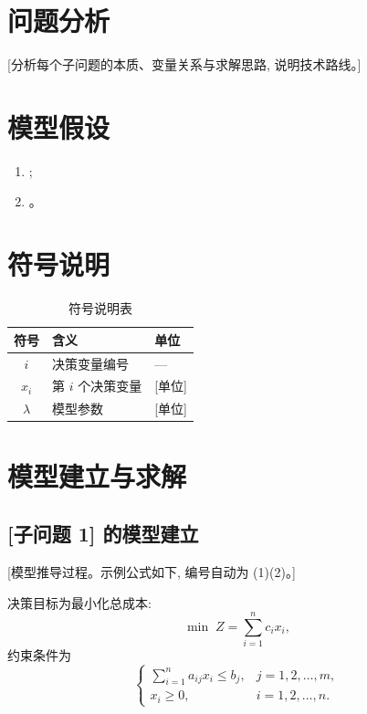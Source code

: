 \documentclass[zihao=-4,a4paper]{ctexart}
\begin{document}
\section{问题分析}

[分析每个子问题的本质、变量关系与求解思路, 说明技术路线。]

\section{模型假设}

\begin{enumerate}
  \item [假设 1 及其合理性依据];
  \item [假设 2 及其合理性依据]。
\end{enumerate}

\section{符号说明}

\begin{table}[H]
  \centering
  \caption{符号说明表}
  \begin{tabular}{cll}
    \toprule
    符号 & 含义 & 单位 \\
    \midrule
    $i$   & 决策变量编号 & --- \\
    $x_i$ & 第 $i$ 个决策变量 & [单位] \\
    $\lambda$ & 模型参数 & [单位] \\
    \bottomrule
  \end{tabular}
\end{table}

\section{模型建立与求解}

\subsection{[子问题 1] 的模型建立}

[模型推导过程。示例公式如下, 编号自动为 (1)(2)。]

决策目标为最小化总成本:
\begin{equation}
  \min \; Z = \sum_{i=1}^{n} c_i x_i,
\end{equation}
约束条件为
\begin{equation}
  \begin{cases}
    \displaystyle\sum_{i=1}^{n} a_{ij} x_i \le b_j, & j = 1,2,\dots,m, \\
    x_i \ge 0, & i = 1,2,\dots,n.
  \end{cases}
\end{equation}
\end{document}

